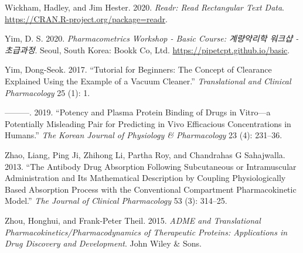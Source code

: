 \documentclass[
  11pt,
  krantz2, a4paper, twoside]{krantz}
\newlength{\cslhangindent}
\newenvironment{CSLReferences}[2] %
 {\begin{list}{}{%
  \setlength{\itemindent}{0pt}
  \setlength{\leftmargin}{0pt}
  \setlength{\parsep}{0pt}
  \ifodd #1
   \setlength{\leftmargin}{\cslhangindent}
   \setlength{\itemindent}{-1\cslhangindent}
  \fi
  \setlength{\itemsep}{#2\baselineskip}}}
 {\end{list}}
\theoremstyle{definition}
\theoremstyle{definition}
\theoremstyle{definition}
\theoremstyle{definition}
\theoremstyle{remark}
\begin{document}
\begin{CSLReferences}{1}{0}
Wickham, Hadley, and Jim Hester. 2020. \emph{Readr: Read Rectangular Text Data}. \url{https://CRAN.R-project.org/package=readr}.

Yim, D. S. 2020. \emph{Pharmacometrics Workshop - Basic Course: 계량약리학 워크샵 - 초급과정}. Seoul, South Korea: Bookk Co, Ltd. \url{https://pipetcpt.github.io/basic}.

Yim, Dong-Seok. 2017. {``Tutorial for Beginners: The Concept of Clearance Explained Using the Example of a Vacuum Cleaner.''} \emph{Translational and Clinical Pharmacology} 25 (1): 1.

---------. 2019. {``Potency and Plasma Protein Binding of Drugs in Vitro---a Potentially Misleading Pair for Predicting in Vivo Efficacious Concentrations in Humans.''} \emph{The Korean Journal of Physiology \& Pharmacology} 23 (4): 231--36.

Zhao, Liang, Ping Ji, Zhihong Li, Partha Roy, and Chandrahas G Sahajwalla. 2013. {``The Antibody Drug Absorption Following Subcutaneous or Intramuscular Administration and Its Mathematical Description by Coupling Physiologically Based Absorption Process with the Conventional Compartment Pharmacokinetic Model.''} \emph{The Journal of Clinical Pharmacology} 53 (3): 314--25.

Zhou, Honghui, and Frank-Peter Theil. 2015. \emph{ADME and Translational Pharmacokinetics/Pharmacodynamics of Therapeutic Proteins: Applications in Drug Discovery and Development}. John Wiley \& Sons.

\end{CSLReferences}

\printindex
\end{document}
